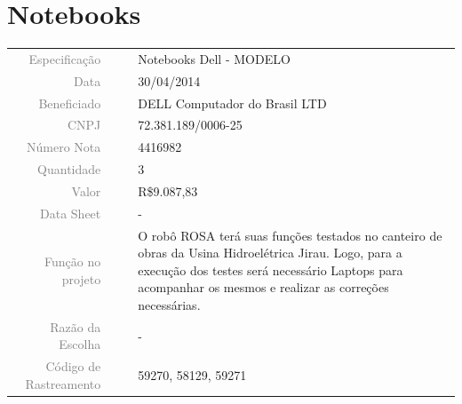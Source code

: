 




\section{Notebooks}
\label{notebook}


\begin{table}[ht!]

	\begin{tabular}{r l|l p{12cm} }
		
		\textcolor{gray}{Especificação} &&& 	{Notebooks Dell - MODELO}\\
		\textcolor{gray}{Data} &&& 				{30/04/2014}\\
        \textcolor{gray}{Beneficiado} &&&		{DELL Computador do Brasil LTD} \\
        \textcolor{gray}{CNPJ} &&& 				{72.381.189/0006-25} \\
        \textcolor{gray}{Número Nota} &&& 		{4416982} \\
		\textcolor{gray}{Quantidade} &&& 		{3} \\
		\textcolor{gray}{Valor} &&& 			{R\$9.087,83} \\
		\textcolor{gray}{Data Sheet} &&& 		{-} \\

		\textcolor{gray}{Função no projeto} &&& {O robô ROSA terá suas funções testados no canteiro de obras da Usina Hidroelétrica Jirau. Logo, para a execução dos testes será necessário Laptops para acompanhar os mesmos e realizar as correções necessárias.  } \\
		\textcolor{gray}{Razão da Escolha} &&& {-}\\
		\textcolor{gray}{Código de Rastreamento} &&& {59270, 58129, 59271}
	\end{tabular}
\end{table}

\newpage

